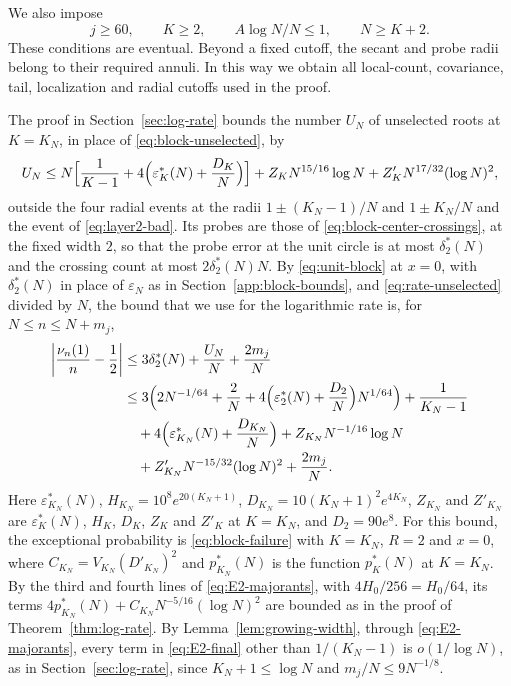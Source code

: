 We also impose
\[
 j\ge60,\qquad K\ge2,\qquad A\log N/N\le1,\qquad N\ge K+2.
\]
These conditions are eventual.
Beyond a fixed cutoff, the secant and probe radii belong to their
required annuli.
In this way we obtain all local-count, covariance, tail, localization
and radial cutoffs used in the proof.

The proof in Section~\ref{sec:log-rate} bounds the number $U_N$ of
unselected roots at $K=K_N$, in place of \eqref{eq:block-unselected}, by
\begin{equation}
 U_N\le N\Bigl[\frac1{K-1}+4\Bigl(\varepsilon_K^*(N)+\frac{D_K}N\Bigr)\Bigr]
 +Z_KN^{15/16}\log N+Z'_KN^{17/32}(\log N)^2,
 \label{eq:rate-unselected}
\end{equation}
outside the four radial events at the radii $1\pm(K_N-1)/N$ and
$1\pm K_N/N$ and the event of \eqref{eq:layer2-bad}.
Its probes are those of \eqref{eq:block-center-crossings}, at the fixed
width $2$, so that the probe error at the unit circle is at most
$\delta_2^*(N)$ and the crossing count at most $2\delta_2^*(N)N$.
By \eqref{eq:unit-block} at $x=0$, with $\delta_2^*(N)$ in place of
$\varepsilon_N$ as in Section~\ref{app:block-bounds}, and
\eqref{eq:rate-unselected} divided by $N$, the bound that we
use for the logarithmic rate is, for $N\le n\le N+m_j$,
\begin{align}
 \left|\frac{\nu_n(1)}n-\frac12\right|
 &\le3\delta_2^*(N)+\frac{U_N}N+\frac{2m_j}{N}\nonumber\\
 &\le3\Bigl(2N^{-1/64}+\frac2N
   +4\Bigl(\varepsilon_2^*(N)+\frac{D_2}N\Bigr)N^{1/64}\Bigr)
   +\frac1{K_N-1}\nonumber\\
 &\quad+4\Bigl(\varepsilon_{K_N}^*(N)+\frac{D_{K_N}}N\Bigr)
   +Z_{K_N}N^{-1/16}\log N\nonumber\\
 &\quad+Z'_{K_N}N^{-15/32}(\log N)^2+\frac{2m_j}{N}.
 \label{eq:E2-final}
\end{align}
Here $\varepsilon_{K_N}^*(N)$, $H_{K_N}=10^8e^{20(K_N+1)}$,
$D_{K_N}=10(K_N+1)^2e^{4K_N}$, $Z_{K_N}$ and $Z'_{K_N}$ are
$\varepsilon_K^*(N)$, $H_K$, $D_K$, $Z_K$ and $Z'_K$ at $K=K_N$, and
$D_2=90e^8$.
For this bound, the exceptional probability is \eqref{eq:block-failure}
with $K=K_N$, $R=2$ and $x=0$, where $C_{K_N}=V_{K_N}(D'_{K_N})^2$ and
$p_{K_N}^*(N)$ is the function $p_K^*(N)$ at $K=K_N$. By the third and
fourth lines of \eqref{eq:E2-majorants}, with $4H_0/256=H_0/64$, its terms
$4p_{K_N}^*(N)+C_{K_N}N^{-5/16}(\log N)^2$ are bounded as in the proof of
Theorem~\ref{thm:log-rate}.
By Lemma~\ref{lem:growing-width}, through \eqref{eq:E2-majorants}, every
term in \eqref{eq:E2-final} other than $1/(K_N-1)$ is $o(1/\log N)$, as
in Section~\ref{sec:log-rate}, since $K_N+1\le\log N$ and
$m_j/N\le9N^{-1/8}$.

